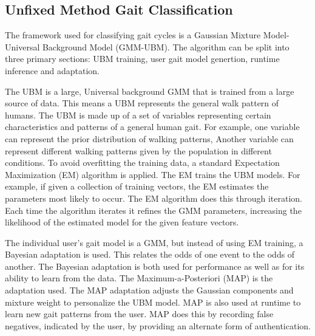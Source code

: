 \documentclass{sig-alternate}
\begin{document}
\subsection{Unfixed Method Gait Classification}
The framework used for classifying gait cycles is a Gaussian Mixture Model-Universal Background Model (GMM-UBM). The algorithm can be split into three primary sections: UBM training, user gait model genertion, runtime inference and adaptation.
 

	 The UBM is a large, Universal background GMM that is trained from a large source of data. This means a UBM represents the general walk pattern of humans. The UBM is made up of a set of variables representing certain characteristics and patterns of a general human gait. For example, one variable can represent the prior distribution of walking patterns, Another variable can represent different walking patterns given by the population in different conditions. To avoid overfitting the training data, a standard Expectation Maximization (EM) algorithm is applied. The EM trains the UBM models. For example, if given a collection of training vectors, the EM estimates the parameters most likely to occur. The EM algorithm does this through iteration. Each time the algorithm iterates it refines the GMM parameters, increasing the likelihood of the estimated model for the given feature vectors. 

	The individual user's gait model is a GMM, but instead of using EM training, a Bayesian adaptation is used. This relates the odds of one event to the odds of another. The Bayesian adaptation is both used for performance as well as for its ability to learn from the data. The Maximum-a-Posteriori (MAP) is the adaptation used. The MAP adaptation adjusts the Gaussian components and mixture weight to personalize the UBM model. MAP is also used at runtime to learn new gait patterns from the user. MAP does this by recording false negatives, indicated by the user, by providing an alternate form of authentication. 
\end{document}
